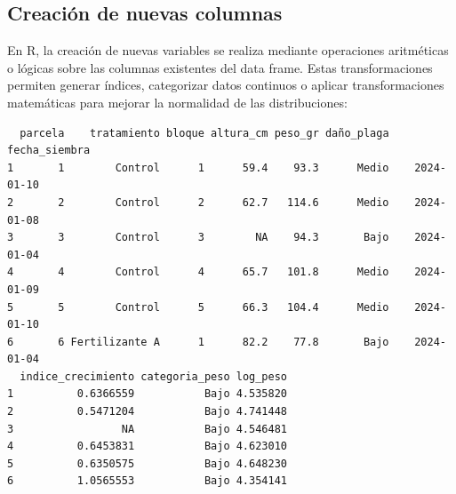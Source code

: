 \documentclass[
  spanish,
  a4paper,
  DIV=11,
  numbers=noendperiod,
  onepage,
  openany]{scrreprt}
\newenvironment{Shaded}{\begin{snugshade}}{\end{snugshade}}
\newcommand{\CommentTok}[1]{\textcolor[rgb]{0.37,0.37,0.37}{#1}}
\newcommand{\DecValTok}[1]{\textcolor[rgb]{0.68,0.00,0.00}{#1}}
\newcommand{\FunctionTok}[1]{\textcolor[rgb]{0.28,0.35,0.67}{#1}}
\newcommand{\NormalTok}[1]{\textcolor[rgb]{0.00,0.23,0.31}{#1}}
\newcommand{\OtherTok}[1]{\textcolor[rgb]{0.00,0.23,0.31}{#1}}
\newcommand{\SpecialCharTok}[1]{\textcolor[rgb]{0.37,0.37,0.37}{#1}}
\newcommand{\StringTok}[1]{\textcolor[rgb]{0.13,0.47,0.30}{#1}}
\begin{document}
\subsection{Creación de nuevas
columnas}\label{creaciuxf3n-de-nuevas-columnas}

En R, la creación de nuevas variables se realiza mediante operaciones
aritméticas o lógicas sobre las columnas existentes del data frame.
Estas transformaciones permiten generar índices, categorizar datos
continuos o aplicar transformaciones matemáticas para mejorar la
normalidad de las distribuciones:

\begin{Shaded}
\end{Shaded}

\begin{verbatim}
  parcela    tratamiento bloque altura_cm peso_gr daño_plaga fecha_siembra
1       1        Control      1      59.4    93.3      Medio    2024-01-10
2       2        Control      2      62.7   114.6      Medio    2024-01-08
3       3        Control      3        NA    94.3       Bajo    2024-01-04
4       4        Control      4      65.7   101.8      Medio    2024-01-09
5       5        Control      5      66.3   104.4      Medio    2024-01-10
6       6 Fertilizante A      1      82.2    77.8       Bajo    2024-01-04
  indice_crecimiento categoria_peso log_peso
1          0.6366559           Bajo 4.535820
2          0.5471204           Bajo 4.741448
3                 NA           Bajo 4.546481
4          0.6453831           Bajo 4.623010
5          0.6350575           Bajo 4.648230
6          1.0565553           Bajo 4.354141
\end{verbatim}
\end{document}
